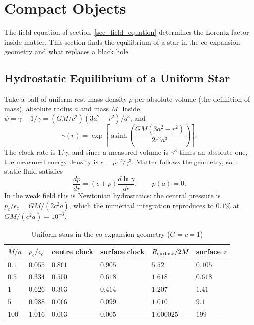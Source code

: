 
\section{Compact Objects}\label{sec_compact_objects}

The field equation of section~\ref{sec_field_equation} determines the Lorentz factor inside matter. This section finds the equilibrium of a star in the co-expansion geometry and what replaces a black hole.

\subsection{Hydrostatic Equilibrium of a Uniform Star}

Take a ball of uniform rest-mass density $\rho$ per absolute volume (the definition of mass), absolute radius $a$ and mass $M$. Inside, $\psi=\gamma-1/\gamma=(GM/c^2)(3a^2-r^2)/a^3$, and
\begin{equation}
    \gamma(r)=\exp\!\left[\operatorname{asinh}\!\left(\frac{GM(3a^2-r^2)}{2c^2a^3}\right)\right].
\end{equation}
The clock rate is $1/\gamma$, and since a measured volume is $\gamma^3$ times an absolute one, the measured energy density is $\epsilon=\rho c^2/\gamma^3$. Matter follows the geometry, so a static fluid satisfies
\begin{equation}\label{eq_hydrostatic_coexp}
    \frac{dp}{dr}=\left(\epsilon+p\right)\frac{d\ln\gamma}{dr},
    \qquad p(a)=0 .
\end{equation}
In the weak field this is Newtonian hydrostatics: the central pressure is $p_c/\epsilon_c=GM/(2c^2a)$, which the numerical integration reproduces to $0.1\%$ at $GM/(c^2a)=10^{-3}$.

\begin{table}[h]
\caption{Uniform stars in the co-expansion geometry ($G=c=1$)}
\label{table_uniform_stars}
\begin{tabular}{@{}llllll@{}}
\toprule
$M/a$ & $p_c/\epsilon_c$ & centre clock & surface clock & $R_{\rm surface}/2M$ & surface $z$\\
\midrule
$0.1$ & $0.055$ & $0.861$ & $0.905$ & $5.52$ & $0.105$\\
$0.5$ & $0.334$ & $0.500$ & $0.618$ & $1.618$ & $0.618$\\
$1$ & $0.626$ & $0.303$ & $0.414$ & $1.207$ & $1.41$\\
$5$ & $0.988$ & $0.066$ & $0.099$ & $1.010$ & $9.1$\\
$100$ & $1.016$ & $0.003$ & $0.005$ & $1.000025$ & $199$\\
\bottomrule
\end{tabular}
\end{table}

